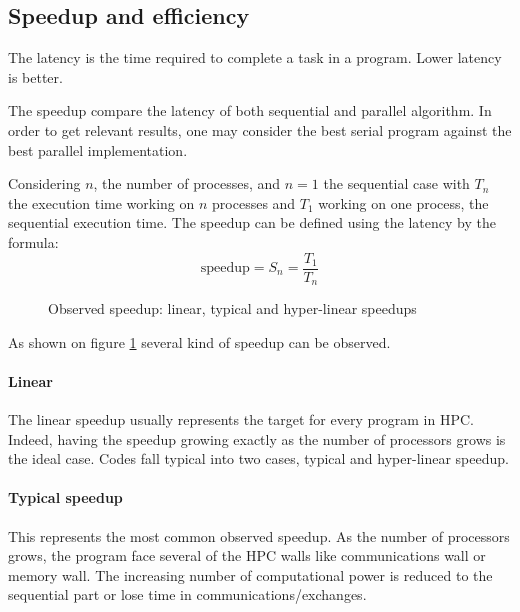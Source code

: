 \subsection{Speedup and efficiency}
The latency is the time required to complete a task in a program.
Lower latency is better. 

The speedup compare the latency of both sequential and parallel algorithm. 
In order to get relevant results, one may consider the best serial program against the best parallel implementation.

Considering $n$, the number of processes, and $n=1$ the sequential case with $T_n$ the execution time working on $n$ processes and $T_1$ working on one process, the sequential execution time. 
The speedup can be defined using the latency by the formula: 
\begin{equation}
\text{speedup} = S_n =  \frac{T_1}{T_n}
\end{equation}

\begin{figure}
\centering 
{}
\caption{Observed speedup: linear, typical and hyper-linear speedups}
\label{fig:1_HPC:speedup_obs}
\end{figure}

As shown on figure \ref{fig:1_HPC:speedup_obs} several kind of speedup can be observed. 
\paragraph{Linear}
The linear speedup usually represents the target for every program in HPC. 
Indeed, having the speedup growing exactly as the number of processors grows is the ideal case. 
Codes fall typical into two cases, typical and hyper-linear speedup. 
\paragraph{Typical speedup}
This represents the most common observed speedup. 
As the number of processors grows, the program face several of the HPC walls like communications wall or memory wall. 
The increasing number of computational power is reduced to the sequential part or lose time in communications/exchanges. 
